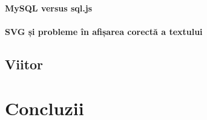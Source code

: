 \documentclass[12pt, a4paper, twoside, romanian]{teza-upb}
\begin{document}
      \subsubsection{MySQL versus sql.js} %
      \label{ssub:MySQL versus sql.js}

      \subsubsection{SVG și probleme în afișarea corectă a textului}
      \label{subsubsec:svg-problems}

  \section{Viitor}
  \chapter*{Concluzii}



\appendix
\end{document}
